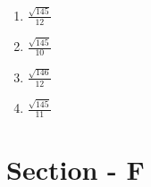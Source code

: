 \documentclass[journal,12pt,twocolumn]{IEEEtran}
\theoremstyle{remark}
\begin{document}
\begin{enumerate}
{		\begin{multicols}{4}
		\begin{enumerate}
			\item{$\frac{\sqrt{145}}{12}$}
			\columnbreak
			\item{$\frac{\sqrt{145}}{10}$}
			\columnbreak
			\item{$\frac{\sqrt{146}}{12}$}
			\columnbreak
			\item{$\frac{\sqrt{145}}{11}$}
		\end{enumerate}
		\end{multicols}
	}
\end{enumerate}

\onecolumn
\section*{Section - F}
\end{document}
